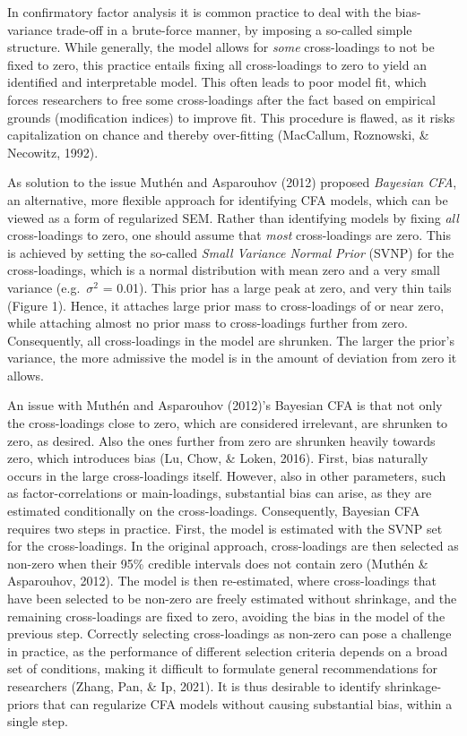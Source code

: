 \documentclass[
  man, donotrepeattitle,floatsintext]{apa6}
\begin{document}
In confirmatory factor analysis it is common practice to deal with the bias-variance trade-off in a brute-force manner, by imposing a so-called simple structure. While generally, the model allows for \emph{some} cross-loadings to not be fixed to zero, this practice entails fixing all cross-loadings to zero to yield an identified and interpretable model. This often leads to poor model fit, which forces researchers to free some cross-loadings after the fact based on empirical grounds (modification indices) to improve fit. This procedure is flawed, as it risks capitalization on chance and thereby over-fitting (MacCallum, Roznowski, \& Necowitz, 1992).

As solution to the issue Muthén and Asparouhov (2012) proposed \emph{Bayesian CFA}, an alternative, more flexible approach for identifying CFA models, which can be viewed as a form of regularized SEM. Rather than identifying models by fixing \emph{all} cross-loadings to zero, one should assume that \emph{most} cross-loadings are zero. This is achieved by setting the so-called \emph{Small Variance Normal Prior} (SVNP) for the cross-loadings, which is a normal distribution with mean zero and a very small variance (e.g.~\(\sigma^2\) = 0.01). This prior has a large peak at zero, and very thin tails (Figure 1). Hence, it attaches large prior mass to cross-loadings of or near zero, while attaching almost no prior mass to cross-loadings further from zero. Consequently, all cross-loadings in the model are shrunken. The larger the prior's variance, the more admissive the model is in the amount of deviation from zero it allows.

An issue with Muthén and Asparouhov (2012)'s Bayesian CFA is that not only the cross-loadings close to zero, which are considered irrelevant, are shrunken to zero, as desired. Also the ones further from zero are shrunken heavily towards zero, which introduces bias (Lu, Chow, \& Loken, 2016). First, bias naturally occurs in the large cross-loadings itself. However, also in other parameters, such as factor-correlations or main-loadings, substantial bias can arise, as they are estimated conditionally on the cross-loadings. Consequently, Bayesian CFA requires two steps in practice. First, the model is estimated with the SVNP set for the cross-loadings. In the original approach, cross-loadings are then selected as non-zero when their 95\% credible intervals does not contain zero (Muthén \& Asparouhov, 2012). The model is then re-estimated, where cross-loadings that have been selected to be non-zero are freely estimated without shrinkage, and the remaining cross-loadings are fixed to zero, avoiding the bias in the model of the previous step. Correctly selecting cross-loadings as non-zero can pose a challenge in practice, as the performance of different selection criteria depends on a broad set of conditions, making it difficult to formulate general recommendations for researchers (Zhang, Pan, \& Ip, 2021). It is thus desirable to identify shrinkage-priors that can regularize CFA models without causing substantial bias, within a single step.
\end{document}

